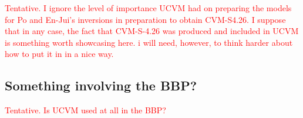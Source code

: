 \textcolor{red}{Tentative. I ignore the level of importance UCVM had on preparing the models for Po and En-Jui's inversions in preparation to obtain CVM-S4.26. I suppose that in any case, the fact that CVM-S-4.26 was produced and included in UCVM is something worth showcasing here. i will need, however, to think harder about how to put it in in a nice way.}

\subsection{Something involving the BBP?}

\textcolor{red}{Tentative. Is UCVM used at all in the BBP?}
